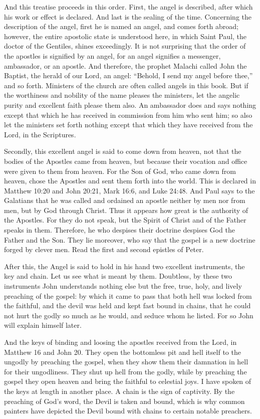 And this treatise proceeds in this order. First, the angel is described, after which his work or effect is declared. And last is the sealing of the time. Concerning the description of the angel, first he is named an angel, and comes forth abroad; however, the entire apostolic state is understood here, in which Saint Paul, the doctor of the Gentiles, shines exceedingly. It is not surprising that the order of the apostles is signified by an angel, for an angel signifies a messenger, ambassador, or an apostle. And therefore, the prophet Malachi called John the Baptist, the herald of our Lord, an angel: “Behold, I send my angel before thee,” and so forth. Ministers of the church are often called angels in this book. But if the worthiness and nobility of the name pleases the ministers, let the angelic purity and excellent faith please them also. An ambassador does and says nothing except that which he has received in commission from him who sent him; so also let the ministers set forth nothing except that which they have received from the Lord, in the Scriptures.

Secondly, this excellent angel is said to come down from heaven, not that the bodies of the Apostles came from heaven, but because their vocation and office were given to them from heaven. For the Son of God, who came down from heaven, chose the Apostles and sent them forth into the world. This is declared in Matthew 10:20 and John 20:21, Mark 16:6, and Luke 24:48. And Paul says to the Galatians that he was called and ordained an apostle neither by men nor from men, but by God through Christ. Thus it appears how great is the authority of the Apostles. For they do not speak, but the Spirit of Christ and of the Father speaks in them. Therefore, he who despises their doctrine despises God the Father and the Son. They lie moreover, who say that the gospel is a new doctrine forged by clever men. Read the first and second epistles of Peter.

After this, the Angel is said to hold in his hand two excellent instruments, the key and chain. Let us see what is meant by them. Doubtless, by these two instruments John understands nothing else but the free, true, holy, and lively preaching of the gospel: by which it came to pass that both hell was locked from the faithful, and the devil was held and kept fast bound in chains, that he could not hurt the godly so much as he would, and seduce whom he listed. For so John will explain himself later.

And the keys of binding and loosing the apostles received from the Lord, in Matthew 16 and John 20. They open the bottomless pit and hell itself to the ungodly by preaching the gospel, when they show them their damnation in hell for their ungodliness. They shut up hell from the godly, while by preaching the gospel they open heaven and bring the faithful to celestial joys. I have spoken of the keys at length in another place. A chain is the sign of captivity. By the preaching of God’s word, the Devil is taken and bound, which is why common painters have depicted the Devil bound with chains to certain notable preachers.

